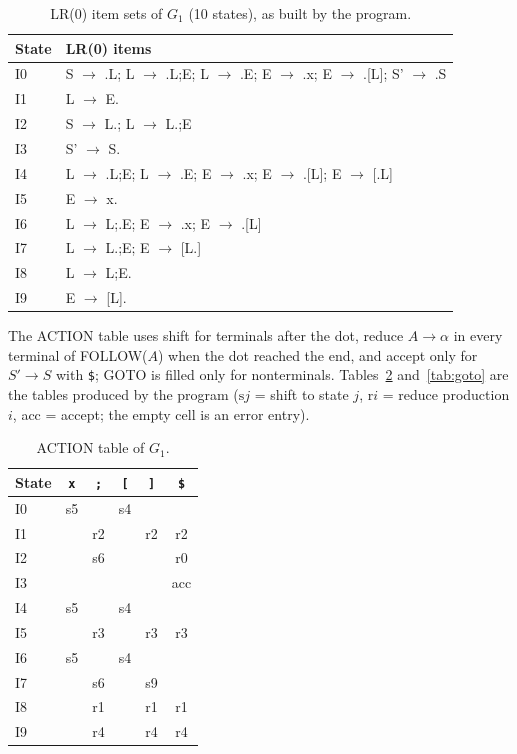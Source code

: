 \documentclass[11pt,letterpaper]{article}
\newcommand{\nt}[1]{\texttt{#1}}
\begin{document}
\begin{table}[H]
\centering
\small
\caption{LR(0) item sets of $G_1$ (10 states), as built by the program.}
\label{tab:estados}
\begin{tabularx}{\textwidth}{@{}l >{\raggedright\arraybackslash}X@{}}
\toprule
\textbf{State} & \textbf{LR(0) items}\\
\midrule
I0 & S $\to$ .L; L $\to$ .L;E; L $\to$ .E; E $\to$ .x; E $\to$ .[L]; S' $\to$ .S \\
I1 & L $\to$ E. \\
I2 & S $\to$ L.; L $\to$ L.;E \\
I3 & S' $\to$ S. \\
I4 & L $\to$ .L;E; L $\to$ .E; E $\to$ .x; E $\to$ .[L]; E $\to$ [.L] \\
I5 & E $\to$ x. \\
I6 & L $\to$ L;.E; E $\to$ .x; E $\to$ .[L] \\
I7 & L $\to$ L.;E; E $\to$ [L.] \\
I8 & L $\to$ L;E. \\
I9 & E $\to$ [L]. \\
\bottomrule
\end{tabularx}
\end{table}

The ACTION table uses shift for terminals after the dot, reduce $A \to \alpha$ in every terminal of
FOLLOW($A$) when the dot reached the end, and accept only for $S' \to S$ with \nt{\$}; GOTO is
filled only for nonterminals. Tables~\ref{tab:action} and~\ref{tab:goto} are the tables produced by
the program ($\mathrm{s}j$ = shift to state $j$, $\mathrm{r}i$ = reduce production $i$, acc =
accept; the empty cell is an error entry).

\begin{table}[H]
\centering
\small
\caption{ACTION table of $G_1$.}
\label{tab:action}
\begin{tabular}{@{}l ccccc@{}}
\toprule
\textbf{State} & \nt{x} & \nt{;} & \nt{[} & \nt{]} & \nt{\$}\\
\midrule
I0 & s5 & & s4 & & \\
I1 & & r2 & & r2 & r2\\
I2 & & s6 & & & r0\\
I3 & & & & & acc\\
I4 & s5 & & s4 & & \\
I5 & & r3 & & r3 & r3\\
I6 & s5 & & s4 & & \\
I7 & & s6 & & s9 & \\
I8 & & r1 & & r1 & r1\\
I9 & & r4 & & r4 & r4\\
\bottomrule
\end{tabular}
\end{table}
\end{document}
